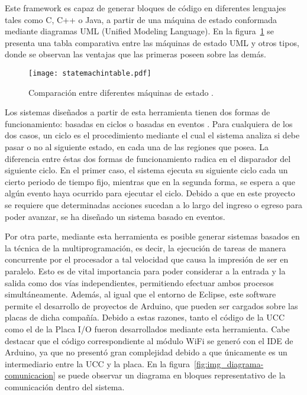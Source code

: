 Este framework es capaz de generar bloques de código en diferentes lenguajes tales como C, C++ o Java, a partir de una máquina de estado conformada mediante diagramas UML (Unified Modeling Language). En la figura~\ref{fig:img_statemachintable} se presenta una tabla comparativa entre las máquinas de estado UML y otros tipos, donde se observan las ventajas que las primeras poseen sobre las demás.

\begin{figure}[H]
	\centering
	\texttt{[image: statemachintable.pdf]}
	\caption{Comparación entre diferentes máquinas de estado \cite{yakindustatemachine}.}
	\label{fig:img_statemachintable}
\end{figure}

Los sistemas diseñados a partir de esta herramienta tienen dos formas de funcionamiento: basadas en ciclos o basadas en eventos \cite{yakinduevent-cycle}. Para cualquiera de los dos casos, un ciclo es el procedimiento mediante el cual el sistema analiza si debe pasar o no al siguiente estado, en cada una de las regiones que posea. La diferencia entre éstas dos formas de funcionamiento radica en el disparador del siguiente ciclo. En el primer caso, el sistema ejecuta su siguiente ciclo cada un cierto periodo de tiempo fijo, mientras que en la segunda forma, se espera a que algún evento haya ocurrido para ejecutar el ciclo. Debido a que en este proyecto se requiere que determinadas acciones sucedan a lo largo del ingreso o egreso para poder avanzar, se ha diseñado un sistema basado en eventos.

Por otra parte, mediante esta herramienta es posible generar sistemas basados en la técnica de la multiprogramación, es decir, la ejecución de tareas de manera concurrente por el procesador a tal velocidad que causa la impresión de ser en paralelo. Esto es de vital importancia para poder considerar a la entrada y la salida como dos vías independientes, permitiendo efectuar ambos procesos simultáneamente. Además, al igual que el entorno de Eclipse, este software permite el desarrollo de proyectos de Arduino, que pueden ser cargados sobre las placas de dicha compañía. Debido a estas razones, tanto el código de la UCC como el de la Placa I/O fueron desarrollados mediante esta herramienta. Cabe destacar que el código correspondiente al módulo WiFi se generó con el IDE de Arduino, ya que no presentó gran complejidad debido a que únicamente es un intermediario entre la UCC y la placa. En la figura~\ref{fig:img_diagrama-comunicacion} se puede observar un diagrama en bloques representativo de la comunicación dentro del sistema.

